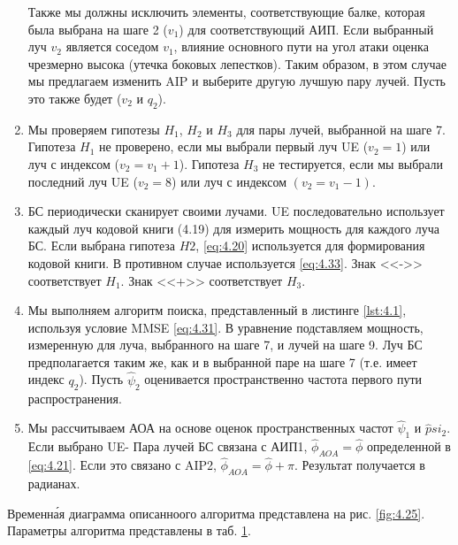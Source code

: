 \begin{enumerate}[label=\textbf{Шаг \arabic*:}]
        Также мы должны исключить элементы, соответствующие балке, которая была
        выбрана на шаге 2 ($v_1$) для соответствующий АИП. Если выбранный луч 
        $v_2$
        является соседом $v_1$, влияние основного пути на угол атаки оценка
        чрезмерно высока (утечка боковых лепестков). Таким образом, в этом
        случае мы предлагаем изменить AIP и выберите другую лучшую пару лучей.
        Пусть это также будет ($v_2$ и $q_2$).
    \item Мы проверяем гипотезы $H_1$, $H_2$ и $H_3$ для пары лучей, выбранной
          на шаге 7. Гипотеза $H_1$ не проверено, если мы выбрали первый луч UE ($v_2
          = 1$) или луч с индексом ($v_2 = v_1+1$). Гипотеза $H_3$ не тестируется,
          если мы выбрали последний луч UE ($v_2 = 8$) или луч с индексом 
          $(v_2 = v_1-1)$.
    \item БС периодически сканирует своими лучами. UE последовательно использует каждый луч кодовой книги (4.19) для
        измерить мощность для каждого луча БС. Если выбрана гипотеза $H2$,
        \eqref{eq:4.20} используется для формирования кодовой книги.  
        В противном случае используется \eqref{eq:4.33}. 
        Знак <<->> соответствует $H_1$. Знак <<+>> соответствует $H_3$.
    \item Мы выполняем алгоритм поиска, представленный в листинге \ref{lst:4.1}, 
    используя условие MMSE \eqref{eq:4.31}. В уравнение подставляем мощность,
    измеренную для луча, выбранного на шаге 7, и лучей на шаге 9. Луч БС
    предполагается таким же, как и в выбранной паре на шаге 7 (т.е. имеет индекс
    $q_2$). Пусть $\hat \psi_2$ оценивается пространственно частота первого пути
    распространения.
    \item Мы рассчитываем АОА на основе оценок пространственных частот $\hat \psi_1$ и
    $\hat psi_2$. Если выбрано UE- Пара лучей БС связана с АИП1, $\hat \phi_{AOA}=\hat \phi$
    определенной в \eqref{eq:4.21}. 
    Если это связано с AIP2, $\hat \phi_{AOA} = \hat\phi + \pi$. Результат
    получается в радианах.
\end{enumerate}

Временн\'{а}я диаграмма описанноого алгоритма представлена на рис. \ref{fig:4.25}.
Параметры алгоритма представлены в таб. \ref{tab:4.6}.


\begin{table}
    \begin{tabular}{|c|c|c|}
    \end{tabular}
    \caption{}
    \label{tab:4.6}
\end{table}

